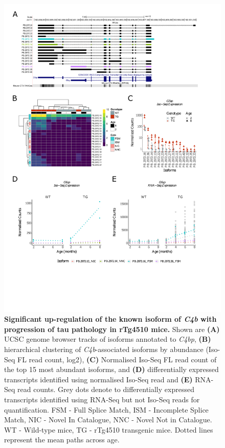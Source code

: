 \begin{figure}[!htp]
	\centering
	\includegraphics[page=2,trim={1.5cm 4.8cm 2cm 1cm}, scale = 0.85]{Figures/Ch5_DiffPlots.pdf}
	\captionsetup{width=0.95\textwidth}
	\caption[Differential \textit{C4b} transcript expression]%
	{\textbf{Significant up-regulation of the known isoform of \textit{C4b} with progression of tau pathology in rTg4510 mice.} Shown are \textbf{(A)} UCSC genome browser tracks of isoforms annotated to \textit{C4bp}, \textbf{(B)} hierarchical clustering of \textit{C4b}-associated isoforms by abundance (Iso-Seq FL read count, log2), \textbf{(C)} Normalised Iso-Seq FL read count of the top 15 most abundant isoforms, and \textbf{(D)} differentially expressed transcripts identified using normalised Iso-Seq read and \textbf{(E)} RNA-Seq read counts. Grey dots denote to differentially expressed transcripts identified using RNA-Seq but not Iso-Seq reads for quantification. FSM - Full Splice Match, ISM - Incomplete Splice Match, NIC - Novel In Catalogue, NNC - Novel Not in Catalogue. WT - Wild-type mice, TG - rTg4510 transgenic mice. Dotted lines represent the mean paths across age.}   
	\label{fig:DEI_c4b}
\end{figure}

